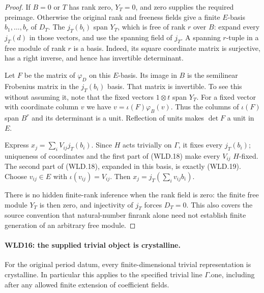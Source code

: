\documentclass[11pt,a4paper]{article}
\numberwithin{equation}{section}
\theoremstyle{remark}\newtheorem{remark}[theorem]{Remark}
\begin{document}
\begin{proof}
If $B=0$ or $T$ has rank zero, $Y_T=0$, and zero supplies the
required preimage. Otherwise the original rank and freeness
fields give a finite $E$-basis $b_1,\ldots,b_r$ of $D_T$.
The $j_T(b_i)$ span $Y_T$, which is free of rank $r$ over $B$:
expand every $j_T(d)$ in those vectors, and use the spanning
field of $j_T$. A spanning $r$-tuple in a free module of rank $r$
is a basis. Indeed, its square coordinate matrix is surjective,
has a right inverse, and hence has invertible determinant.

Let $F$ be the matrix of $\varphi_D$ on this $E$-basis. Its
image in $B$ is the semilinear Frobenius matrix in the
$j_T(b_i)$ basis. That matrix is invertible. To see this without
assuming it, note that the fixed vectors $1\otimes t$ span $Y_T$.
For a fixed vector with coordinate column $v$ we have
$v=\iota(F)\varphi_B(v)$. Thus the columns of $\iota(F)$ span
$B^r$ and its determinant is a unit. Reflection of units makes
$\det F$ a unit in $E$.

Express $x_j=\sum_iV_{ij}j_T(b_i)$. Since $H$ acts trivially
on $\Gamma$, it fixes every $j_T(b_i)$; uniqueness of coordinates
and the first part of (WLD.18) make every $V_{ij}$ $H$-fixed.
The second part of (WLD.18), expanded in this basis, is exactly
(WLD.19). Choose $v_{ij}\in E$ with $\iota(v_{ij})=V_{ij}$.
Then $x_j=j_T(\sum_i v_{ij}b_i)$.

There is no hidden finite-rank inference when the rank field is
zero: the finite free module $Y_T$ is then zero, and injectivity
of $j_T$ forces $D_T=0$. This also covers the source convention
that natural-number finrank alone need not establish finite
generation of an arbitrary free module.
\end{proof}

\paragraph{WLD16: the supplied trivial object is crystalline.}
\label{claim:WLD16}
For the original period datum, every finite-dimensional trivial
representation is crystalline. In particular this applies to the
specified trivial line $\Gamma.\mathrm{one}$, including after any
allowed finite extension of coefficient fields.
\end{document}
